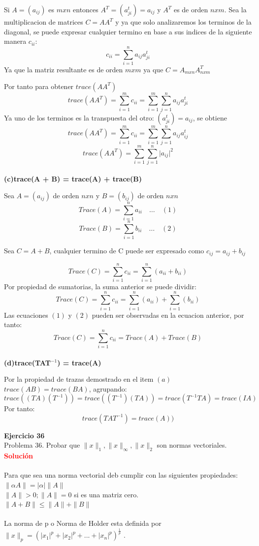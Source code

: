 \documentclass[12pt]{article}
\begin{document}
    Si $A = (a_{ij})$ es $mxn$ entonces $ A^T = (a_{ji}^t) = a_{ij}$ y $A^T$ es de orden $nxm$.
    Sea la multiplicacion de matrices $C = AA^T$ y ya que solo analizaremos los terminos de la diagonal, se puede expresar cualquier termino en base a sus indices de la siguiente manera $c_{ii}$:
    \[
    	 c_{ii} = \sum_{i=1}^n a_{ij}a_{ji}^t
    \]
    Ya que la matriz resultante es de orden $mxm$ ya que $C = A_{mxn}A_{nxm}^T$
    
    Por tanto para obtener $trace(AA^T)$ 
    \[
    	trace(AA^T) = \sum_{i=1}^m c_{ii} = \sum_{i=1}^m\sum_{j=1}^n a_{ij}a_{ji}^t
    \]
    Ya uno de los terminos es la transpuesta del otro: $(a_{ji}^t) = a_{ij}$, se obtiene
    \[
    	trace(AA^T) = \sum_{i=1}^m c_{ii} = \sum_{i=1}^m\sum_{j=1}^n a_{ij}a_{ij}^t
    \]
    \[
    	trace(AA^T) = \sum_{i=1}^m\sum_{j=1}^n {\vert a_{ij}\vert}^2
    \]
    \\
    \textbf{(c)\quad trace(A + B) = trace(A) + trace(B)}
    
    Sea $ A = (a_{ij})$ de orden $nxn$ y $ B =(b_{ij})$ de orden $nxn$ 
    \[Trace(A) = \sum_{i=1}^n a_{ii}\quad\dots\quad(1)\]
    \[Trace(B) = \sum_{i=1}^n b_{ii}\quad\dots\quad(2)\]
    
    Sea $C = A + B$, cualquier termino de C puede ser expresado como $c_{ij} = a_{ij} + b_{ij}$
    
    \[Trace(C) = \sum_{i = 1}^{n}c_{ii} = \sum_{i = 1}^{n} (a_{ii} + b_{ii})\]
    Por propiedad de sumatorias, la suma anterior se puede dividir: 
    \[Trace(C) = \sum_{i = 1}^{n}c_{ii} = \sum_{i = 1}^{n} (a_{ii}) + \sum_{i = 1}^{n}(b_{ii})\]
    Las ecuaciones $(1)$ y $(2)$ pueden ser observadas en la ecuacion anterior, por tanto:
    \[Trace(C) = \sum_{i = 1}^{n}c_{ii} = Trace(A) + Trace(B)\]
    \\
    \textbf{(d)\quad trace(TAT$^{-1}$) = trace(A)}
    
    Por la propiedad de trazas demostrado en el item $(a)$ $trace(AB) = trace(BA)$, agrupando:
    \[
    	trace((TA)(T^{-1})) = trace((T^{-1})(TA))=trace(T^{-1}TA) = trace(IA)
    \]
    Por tanto:
    \[
    	trace(TAT^{-1}) = trace(A))
    \]

\noindent \textbf{Ejercicio 36}\\
Problema 36. Probar que $ \|x\|_{1},\|x\|_{\infty}, \|x\|_{2}$ son normas vectoriales.\\

\noindent \textcolor{red}{\bf Solución}\\
\\Para que sea una norma vectorial deb cumplir con las siguientes propiedades:
  \\ $\|\alpha A\| = |\alpha| \|A\|$
  \\$\|A\| > 0; \|A\| = 0$  si es una matriz cero. 
  \\ $\|A + B\| \leq \|A\| +  \|B\|$ \\
  \\La norma de p o Norma de Holder esta definida por  $\|x\|_{p} = (|x_{1}|^{p} + |x_{2}|^{p} + ... + |x_{n}|^{p})^{\frac{1}{p}}$ .
  
\end{document}
